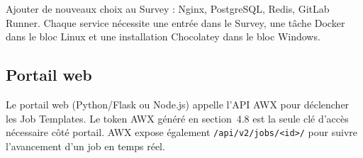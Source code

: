 \documentclass[a4paper]{article}
\newcommand{\cmd}[1]{\texttt{#1}}
\begin{document}
Ajouter de nouveaux choix au Survey : Nginx, PostgreSQL, Redis, GitLab Runner. Chaque service nécessite une entrée dans le Survey, une tâche Docker dans le bloc Linux et une installation Chocolatey dans le bloc Windows.

\subsection{Portail web}

Le portail web (Python/Flask ou Node.js) appelle l'API AWX pour déclencher les Job Templates. Le token AWX généré en section~4.8 est la seule clé d'accès nécessaire côté portail. AWX expose également \cmd{/api/v2/jobs/<id>/} pour suivre l'avancement d'un job en temps réel.

\end{document}
